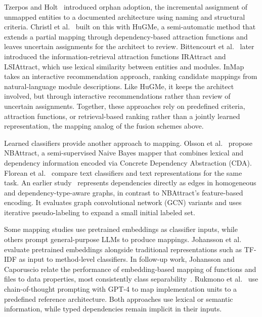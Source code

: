 Tzerpos and Holt~\cite{tzerpos1997orphan} introduced orphan adoption, the incremental assignment of unmapped entities to a documented architecture using naming and structural criteria. Christl et al.~\cite{christl2007automated} built on this with HuGMe, a semi-automatic method that extends a partial mapping through dependency-based attraction functions and leaves uncertain assignments for the architect to review. Bittencourt et al.~\cite{bittencourt_IR} later introduced the information-retrieval attraction functions IRAttract and LSIAttract, which use lexical similarity between entities and modules. InMap~\cite{InMap} takes an interactive recommendation approach, ranking candidate mappings from natural-language module descriptions. Like HuGMe, it keeps the architect involved, but through interactive recommendations rather than review of uncertain assignments. Together, these approaches rely on predefined criteria, attraction functions, or retrieval-based ranking rather than a jointly learned representation, the mapping analog of the fusion schemes above.

Learned classifiers provide another approach to mapping. Olsson et al.~\cite{olsson2022automatically} propose NBAttract, a semi-supervised Naive Bayes mapper that combines lexical and dependency information encoded via Concrete Dependency Abstraction (CDA). Florean et al.~\cite{florean2021textclassifierscomparison} compare text classifiers and text representations for the same task. An earlier study~\cite{jabeen2025graph} represents dependencies directly as edges in homogeneous and dependency-type-aware graphs, in contrast to NBAttract's feature-based encoding. It evaluates graph convolutional network (GCN) variants and uses iterative pseudo-labeling to expand a small initial labeled set.

Some mapping studies use pretrained embeddings as classifier inputs, while others prompt general-purpose LLMs to produce mappings. Johansson et al.~\cite{johansson2024mapping} evaluate pretrained embeddings alongside traditional representations such as TF-IDF as input to method-level classifiers. In follow-up work, Johansson and Caporuscio relate the performance of embedding-based mapping of functions and files to data properties, most consistently class separability~\cite{johansson2026mapping}. Rukmono et al.~\cite{rukmono2024deductive} use chain-of-thought prompting with GPT-4 to map implementation units to a predefined reference architecture. Both approaches use lexical or semantic information, while typed dependencies remain implicit in their inputs.

